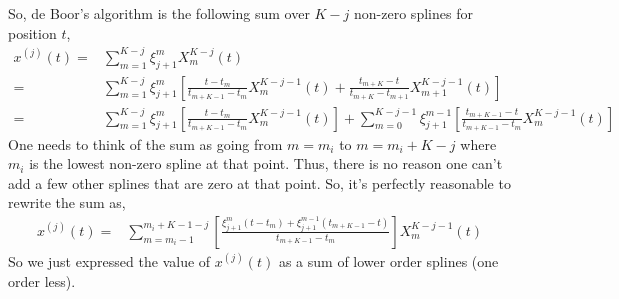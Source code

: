 \documentclass[11pt, oneside]{article}   	%
\begin{document}
So, de Boor's algorithm is the following sum over $K-j$ non-zero splines for position $t$,
\begin{align}
x^{(j)}(t) =& \sum_{m=1}^{K-j} \xi_{j+1}^m X^{K-j}_m(t) \\
=&  \sum_{m=1}^{K-j} \xi_{j+1}^m \left[ \frac{t - t_m}{t_{m+K-1} - t_m} X^{K-j-1}_m(t) + \frac{t_{m+K}-t}{t_{m+K} - t_{m+1}} X^{K-j-1}_{m+1}(t) \right] \\
=& \sum_{m=1}^{K-j} \xi_{j+1}^m \left[ \frac{t - t_m}{t_{m+K-1} - t_m} X^{K-j-1}_m(t) \right] +  \sum_{m=0}^{K-j-1} \xi_{j+1}^{m-1} \left[ \frac{t_{m+K-1}-t}{t_{m+K-1} - t_{m}} X^{K-j-1}_{m}(t) \right] 
\end{align}
One needs to think of the sum as going from $m=m_i$ to $m=m_i + K-j$ where $m_i$ is the lowest non-zero spline at that point. Thus, there is no reason one can't add a few other splines that are zero at that point. So, it's perfectly reasonable to rewrite the sum as,
\begin{align}
x^{(j)}(t) =& \sum_{m=m_i-1}^{m_i+K-1-j}  \left[ \frac{\xi_{j+1}^m(t - t_m) + \xi_{j+1}^{m-1} (t_{m+K-1}-t)  }{t_{m+K-1} - t_m} \right]  X^{K-j-1}_m(t)
\end{align}
So we just expressed the value of $x^{(j)}(t)$ as a sum of lower order splines (one order less).
\end{document}
